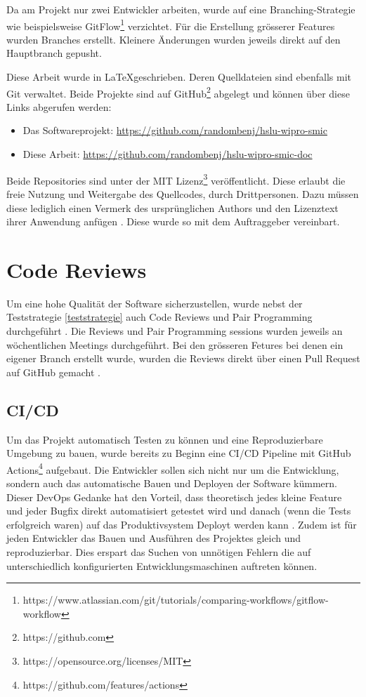 Da am Projekt nur zwei Entwickler arbeiten,
wurde auf eine Branching-Strategie wie beispielsweise
GitFlow\footnote{https://www.atlassian.com/git/tutorials/comparing-workflows/gitflow-workflow} verzichtet.
Für die Erstellung grösserer Features wurden Branches erstellt.
Kleinere Änderungen wurden jeweils direkt auf den Hauptbranch gepusht.

Diese Arbeit wurde in \LaTeX geschrieben. Deren Quelldateien sind ebenfalls mit Git verwaltet.
Beide Projekte sind auf GitHub\footnote{https://github.com} abgelegt und können über diese Links abgerufen werden:

\begin{itemize}
      \item Das Softwareprojekt: \url{https://github.com/randombenj/hslu-wipro-smic}
      \item Diese Arbeit: \url{https://github.com/randombenj/hslu-wipro-smic-doc}
\end{itemize}

Beide Repositories sind unter der MIT Lizenz\footnote{https://opensource.org/licenses/MIT} veröffentlicht.
Diese erlaubt die freie Nutzung und Weitergabe des Quellcodes, durch Drittpersonen.
Dazu müssen diese lediglich einen Vermerk des ursprünglichen Authors und den Lizenztext ihrer Anwendung anfügen \parencite{mit_licence}.
Diese wurde so mit dem Auftraggeber vereinbart.

\section{Code Reviews}

Um eine hohe Qualität der Software sicherzustellen, wurde nebst der Teststrategie \ref{teststrategie}
auch Code Reviews und Pair Programming durchgeführt \parencite{fu2017code}.
Die Reviews und Pair Programming sessions wurden jeweils an wöchentlichen
Meetings durchgeführt.
Bei den grösseren Fetures bei denen ein eigener Branch erstellt wurde, wurden die
Reviews direkt über einen Pull Request auf GitHub gemacht \parencite{github_flow_docs_2021}.

\subsection{\ac{CI/CD}}

Um das Projekt automatisch Testen zu können und eine Reproduzierbare Umgebung zu bauen,
wurde bereits zu Beginn eine \ac{CI/CD} Pipeline mit GitHub Actions\footnote{https://github.com/features/actions}
aufgebaut.
Die Entwickler sollen sich nicht nur um die Entwicklung, sondern auch das automatische Bauen und Deployen der
Software kümmern. Dieser DevOps Gedanke hat den Vorteil, dass
theoretisch jedes kleine Feature und jeder Bugfix direkt automatisiert getestet
wird und danach (wenn die Tests erfolgreich waren) auf das Produktivsystem
Deployt werden kann \parencite{what_is_devops}.
Zudem ist für jeden Entwickler das Bauen und Ausführen des Projektes gleich und
reproduzierbar. Dies erspart das Suchen von unnötigen Fehlern die auf unterschiedlich
konfigurierten Entwicklungsmaschinen auftreten können.
